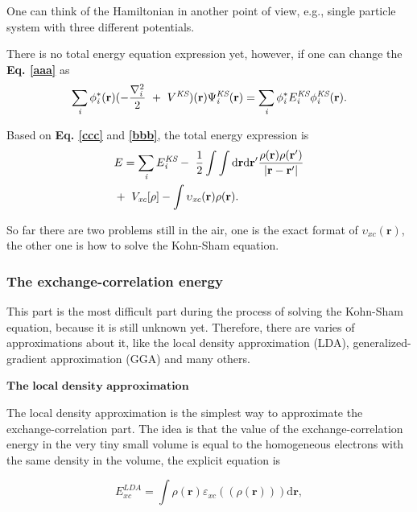 \documentclass[a4paper, 12pt, titlepage,oneside,drop]{kthesis}
\begin{document}
One can think of the Hamiltonian in another point of view, e.g., single particle system with three different potentials. 

There is no total energy equation expression yet, however, if one can change the \textbf{Eq. \ref{aaa}} as 
\begin{equation}\label{bbb}
\sumi<i> \phi^{*}_{\textit{i}}(\textbf{r})(-\frac{\nabla^{2}_{i}}{2}\ + \ V^\textit{KS})(\textbf{r}) \Psi^{\textit{KS}}_{\textit{i}}(\textbf{r}) = \sumi<i> \phi^{*}_{\textit{i}}E^{\textit{KS}}_{\textit{i}} \phi^{\textit{KS}}_{\textit{i}}(\textbf{r}).
\end{equation}

Based on \textbf{Eq. \ref{ccc}} and \textbf{\ref{bbb}}, the total energy expression is
\begin{equation}\label{totalenergy}
\begin{split}
& E= \sumi<i> E^{\textit{KS}}_{\textit{i}} - \ \frac{1}{2} \int \int \mathrm{d} {\textbf{r}} \mathrm{d}{\textbf{r}^{\prime}} \frac{\rho({\textbf{r}})\rho(\textbf{r}^{\prime})}{|{\textbf{r}}-{\textbf{r}}^{\prime}|} \\
&    + \ V_\textit{xc}[\rho] - \int   \upsilon_\textit{xc}(\textbf{r}) \rho({\textbf{r}}).
\end{split}
\end{equation}

So far there are two problems still in the air, one is the exact format of $\upsilon_\textit{xc}(\textbf{r})$, the other one is how to solve the Kohn-Sham equation.

\subsubsection{The exchange-correlation energy}

This part is the most difficult part during the process of solving the Kohn-Sham equation, because it is still unknown yet. Therefore, there
 are varies of approximations about it, like the local density approximation (LDA), generalized-gradient approximation (GGA) and many others.

$\textbf{The local density approximation}$

The local density approximation is the simplest way to approximate the exchange-correlation part. The idea is that the value 
of the exchange-correlation energy in the very tiny small volume is equal to the homogeneous electrons with the same density in 
the volume, the explicit equation is

\begin{equation}
 E^\textit{LDA}_\textit{xc} = \int \rho(\textbf{r}) \varepsilon_\textit{xc}( (\rho(\textbf{r})) ) \mathrm{d} \textbf{r}, 
\end{equation}
\end{document}
